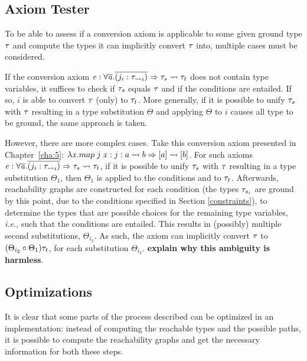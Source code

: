 \subsection{Axiom Tester}
\label{onestep}
To be able to assess if a conversion axiom is applicable to some given ground type $\mathit{\tau}$ and compute the types it can implicitly convert $\mathit{\tau}$ into, multiple cases must be considered.

 If the conversion axiom $\mathit{e} : \forall \overline {\mathit{a}} . \overline{(j_i : \mathit{\tau_{\rightsquigarrow}}_i)} \Rightarrow \mathit{\tau}_s \rightsquigarrow \mathit{\tau}_t$ does not contain type variables, it suffices to check if $\mathit{\tau}_s$ equals $\mathit{\tau}$ and if the conditions are entailed. If so, $i$ is able to convert $\mathit{\tau}$ (only) to $\mathit{\tau}_t$. More generally, if it is possible to unify $\mathit{\tau}_s$ with $\mathit{\tau}$ resulting in a type substitution $\Theta$ and applying $\Theta$ to $i$ causes all type to be ground, the same approach is taken.

 However, there are more complex cases. Take this conversion axiom presented in Chapter~\ref{cha:5}: $\lambda \mathit{x} . map\;j\;\mathit{x}: j: a \rightsquigarrow b \Rightarrow [a] \rightsquigarrow [b] $. For such axioms $\mathit{e} : \forall \overline {\mathit{a}} . \overline{(j_i : \mathit{\tau_{\rightsquigarrow}}_i)} \Rightarrow \mathit{\tau}_s \rightsquigarrow \mathit{\tau}_t$, if it is possible to unify $\mathit{\tau}_s$ with $\mathit{\tau}$ resulting in a type substitution $\Theta_1$, then $\Theta_1$ is applied to the conditions and to $\mathit{\tau}_t$. Afterwards, reachability graphs are constructed for each condition (the types $\mathit{\tau}_{s_i}$ are ground by this point, due to the conditions specified in Section \ref{constraints}), to determine the types that are possible choices for the remaining type variables, \textit{i.e.}, such that the conditions are entailed. This results in (possibly) multiple  second substitutions, $\Theta_{i_2}$. As such, the axiom can implicitly convert $\mathit{\tau}$ to  $(\Theta_{i_2} \circ \Theta_1)\mathit{\tau}_t$, for each substitution $\Theta_{i_2}$. \textbf{explain why this ambiguity is harmless}.



\subsection{Optimizations}
\label{opt}

It is clear that some parts of the process described can be optimized in an implementation: instead of computing the reachable types and the possible paths, it is possible to compute the reachability graphs and get the necessary information for both these steps.

